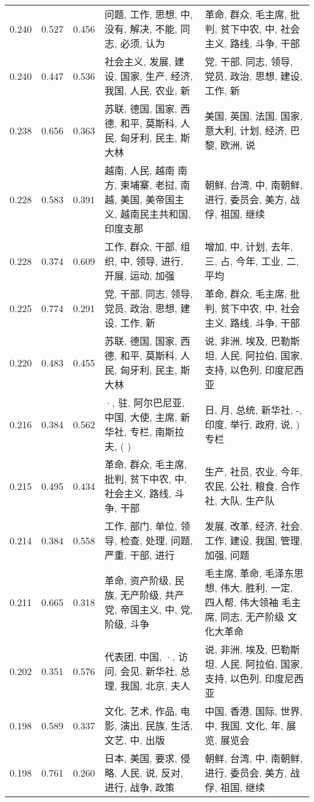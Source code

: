 \begin{tabular}{cccp{5cm}p{5cm}}
0.240 & 0.527 & 0.456 & 问题, 工作, 思想, 中, 没有, 解决, 不能, 同志, 必须, 认为 & 革命, 群众, 毛主席, 批判, 贫下中农, 中, 社会主义, 路线, 斗争, 干部 \\
0.240 & 0.447 & 0.536 & 社会主义, 发展, 建设, 国家, 生产, 经济, 我国, 人民, 农业, 新 & 党, 干部, 同志, 领导, 党员, 政治, 思想, 建设, 工作, 新 \\
0.238 & 0.656 & 0.363 & 苏联, 德国, 国家, 西德, 和平, 莫斯科, 人民, 匈牙利, 民主, 斯大林 & 美国, 英国, 法国, 国家, 意大利, 计划, 经济, 巴黎, 欧洲, 说 \\
0.228 & 0.583 & 0.391 & 越南, 人民, 越南 南方, 柬埔寨, 老挝, 南越, 美国, 美帝国主义, 越南民主共和国, 印度支那 & 朝鲜, 台湾, 中, 南朝鲜, 进行, 委员会, 美方, 战俘, 祖国, 继续 \\
0.228 & 0.374 & 0.609 & 工作, 群众, 干部, 组织, 中, 领导, 进行, 开展, 运动, 加强 & 增加, 中, 计划, 去年, 三, 占, 今年, 工业, 二, 平均 \\
0.225 & 0.774 & 0.291 & 党, 干部, 同志, 领导, 党员, 政治, 思想, 建设, 工作, 新 & 革命, 群众, 毛主席, 批判, 贫下中农, 中, 社会主义, 路线, 斗争, 干部 \\
0.220 & 0.483 & 0.455 & 苏联, 德国, 国家, 西德, 和平, 莫斯科, 人民, 匈牙利, 民主, 斯大林 & 说, 非洲, 埃及, 巴勒斯坦, 人民, 阿拉伯, 国家, 支持, 以色列, 印度尼西亚 \\
0.216 & 0.384 & 0.562 & ·, 驻, 阿尔巴尼亚, 中国, 大使, 主席, 新华社, 专栏, 南斯拉夫, ( ) & 日, 月, 总统, 新华社, -, 印度, 举行, 政府, 说, ) 专栏 \\
0.215 & 0.495 & 0.434 & 革命, 群众, 毛主席, 批判, 贫下中农, 中, 社会主义, 路线, 斗争, 干部 & 生产, 社员, 农业, 今年, 农民, 公社, 粮食, 合作社, 大队, 生产队 \\
0.214 & 0.384 & 0.558 & 工作, 部门, 单位, 领导, 检查, 处理, 问题, 严重, 干部, 进行 & 发展, 改革, 经济, 社会, 工作, 建设, 我国, 管理, 加强, 问题 \\
0.211 & 0.665 & 0.318 & 革命, 资产阶级, 民族, 无产阶级, 共产党, 帝国主义, 中, 党, 阶级, 斗争 & 毛主席, 革命, 毛泽东思想, 伟大, 胜利, 一定, 四人帮, 伟大领袖 毛主席, 同志, 无产阶级 文化大革命 \\
0.202 & 0.351 & 0.576 & 代表团, 中国, ·, 访问, 会见, 新华社, 总理, 我国, 北京, 夫人 & 说, 非洲, 埃及, 巴勒斯坦, 人民, 阿拉伯, 国家, 支持, 以色列, 印度尼西亚 \\
0.198 & 0.589 & 0.337 & 文化, 艺术, 作品, 电影, 演出, 民族, 生活, 文艺, 中, 出版 & 中国, 香港, 国际, 世界, 中, 我国, 文化, 年, 展览, 展览会 \\
0.198 & 0.761 & 0.260 & 日本, 美国, 要求, 侵略, 人民, 说, 反对, 进行, 战争, 政策 & 朝鲜, 台湾, 中, 南朝鲜, 进行, 委员会, 美方, 战俘, 祖国, 继续 \\

\end{tabular}
